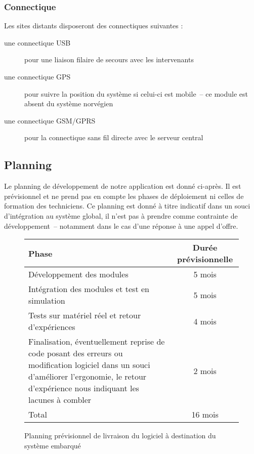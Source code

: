 \documentclass[a4paper, 11pt, final]{article}
\begin{document}
\subsubsection{Connectique}
Les sites distants disposeront des connectiques suivantes :
\begin{description}
\item[une connectique USB] pour une liaison filaire de secours avec les intervenants
\item[une connectique GPS] pour suivre la position du système si celui-ci est mobile~-- ce module est absent du système norvégien
\item[une connectique GSM/GPRS] pour la connectique sans fil directe avec le serveur central
\end{description}

\subsection{Planning}
Le planning de développement de notre application est donné ci-après. Il est prévisionnel et ne prend pas en compte les phases de déploiement ni celles de formation des techniciens. Ce planning est donné à titre indicatif dans un souci d'intégration au système global, il n'est pas à prendre comme contrainte de développement~-- notamment dans le cas d'une réponse à une appel d'offre.

\begin{figure}[h!]
\begin{center}
\begin{tabular}{|p{9cm}|c|}
\hline
Phase & Durée prévisionnelle\\ \hline \hline
Développement des modules & 5 mois\\ \hline
Intégration des modules et test en simulation & 5 mois\\ \hline
Tests sur matériel réel et retour d'expériences & 4 mois\\ \hline
Finalisation, éventuellement reprise de code posant des erreurs ou modification logiciel dans un souci d'améliorer l'ergonomie, le retour d'expérience nous indiquant les lacunes à combler & 2 mois\\ \hline
Total & 16 mois\\ \hline
\end{tabular}
\end{center}
\caption{Planning prévisionnel de livraison du logiciel à destination du système embarqué}
\end{figure}
\end{document}
